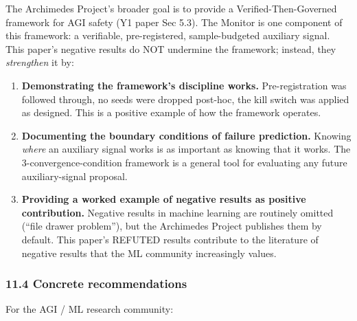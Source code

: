 \documentclass[11pt]{article}
\begin{document}
The Archimedes Project's broader goal is to provide a
Verified-Then-Governed framework for AGI safety (Y1 paper Sec 5.3). The
Monitor is one component of this framework: a verifiable,
pre-registered, sample-budgeted auxiliary signal. This paper's negative
results do NOT undermine the framework; instead, they \emph{strengthen}
it by:

\begin{enumerate}
\def\labelenumi{\arabic{enumi}.}
\item
  \textbf{Demonstrating the framework's discipline works.}
  Pre-registration was followed through, no seeds were dropped post-hoc,
  the kill switch was applied as designed. This is a positive example of
  how the framework operates.
\item
  \textbf{Documenting the boundary conditions of failure prediction.}
  Knowing \emph{where} an auxiliary signal works is as important as
  knowing that it works. The 3-convergence-condition framework is a
  general tool for evaluating any future auxiliary-signal proposal.
\item
  \textbf{Providing a worked example of negative results as positive
  contribution.} Negative results in machine learning are routinely
  omitted (``file drawer problem''), but the Archimedes Project
  publishes them by default. This paper's REFUTED results contribute to
  the literature of negative results that the ML community increasingly
  values.
\end{enumerate}

\subsubsection{11.4 Concrete
recommendations}\label{concrete-recommendations}

For the AGI / ML research community:
\end{document}
